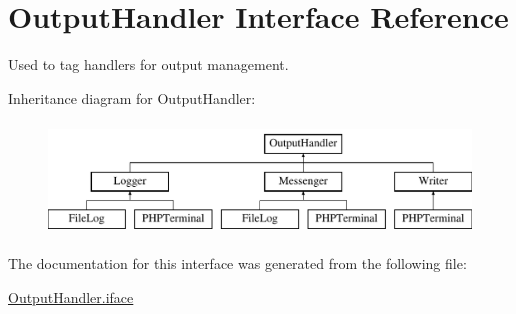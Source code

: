 \hypertarget{interfaceOutputHandler}{\section{Output\-Handler Interface Reference}
\label{interfaceOutputHandler}
}


Used to tag handlers for output management.  


Inheritance diagram for Output\-Handler\-:\begin{figure}[H]
\begin{center}
\leavevmode
\includegraphics[height=3.000000cm]{interfaceOutputHandler}
\end{center}
\end{figure}


The documentation for this interface was generated from the following file\-:\begin{DoxyCompactItemize}
\item 
\hyperlink{OutputHandler_8iface}{Output\-Handler.\-iface}\end{DoxyCompactItemize}
